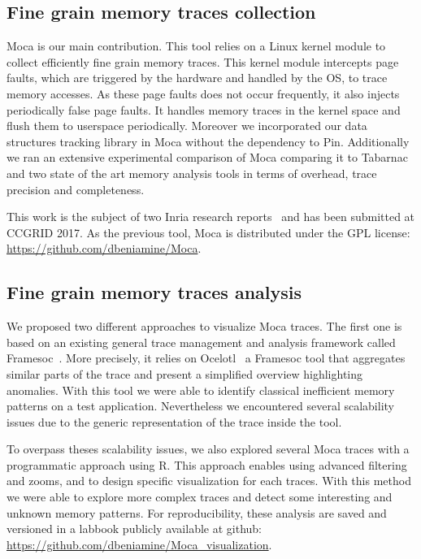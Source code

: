 \subsection{Fine grain memory traces collection}

\gls{Moca} is our main contribution.
This tool relies on a \gls{Linux} kernel module to collect efficiently fine grain memory traces.
This kernel module intercepts page faults, which are triggered by the hardware and handled by the \gls{OS}, to trace memory accesses.
As these page faults does not occur frequently, it also injects periodically false page faults.
It handles memory traces in the kernel space and flush them to userspace periodically.
Moreover we incorporated our data structures tracking library in \gls{Moca} without the dependency to \gls{Pin}.
Additionally we ran an extensive experimental comparison of \gls{Moca} comparing it to \gls{Tabarnac} and two state of the art memory analysis tools in terms of overhead, trace precision and completeness.

This work is the subject of two Inria research reports~\cite{Beniamine15Memory,Beniamine16Moca} and has been submitted at \gls{CCGRID} 2017.
As the previous tool, \gls{Moca} is distributed under the \gls{GPL} license: \url{https://github.com/dbeniamine/Moca}.

\subsection{Fine grain memory traces analysis}

We proposed two different approaches to visualize \gls{Moca} traces.
The first one is based on an existing general trace management and analysis framework called \gls{Framesoc}~\cite{Pagano14frameSoC}.
More precisely, it relies on \gls{Ocelotl}~\cite{Dosimont14Ocelotl} a \gls{Framesoc} tool that aggregates similar parts of the trace and present a simplified overview highlighting anomalies.
With this tool we were able to identify classical inefficient memory patterns on a test application.
Nevertheless we encountered several scalability issues due to the generic representation of the trace inside the tool.

To overpass theses scalability issues, we also explored several \gls{Moca} traces with a programmatic approach using \gls{R}.
This approach enables using advanced filtering and zooms, and to design specific visualization for each traces.
With this method we were able to explore more complex traces and detect some interesting and unknown memory patterns.
For reproducibility, these analysis are saved and versioned in a labbook publicly available at github:\\
\url{https://github.com/dbeniamine/Moca_visualization}.

